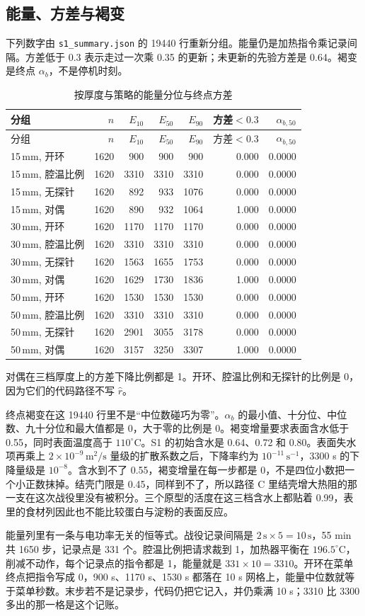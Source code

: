\subsection{能量、方差与褐变}
下列数字由 \texttt{s1\_summary.json} 的 19440 行重新分组。能量仍是加热指令乘记录间隔。方差低于 0.3 表示走过一次乘 0.35 的更新；未更新的先验方差是 0.64。褐变是终点 $\alpha_b$，不是停机时刻。
\begin{longtable}{lrrrrrr}
\caption{按厚度与策略的能量分位与终点方差}\\
\toprule
分组 & $n$ & $E_{10}$ & $E_{50}$ & $E_{90}$ & 方差$<0.3$ & $\alpha_{b,50}$ \\
\midrule\endfirsthead
\toprule 分组 & $n$ & $E_{10}$ & $E_{50}$ & $E_{90}$ & 方差$<0.3$ & $\alpha_{b,50}$ \\\midrule\endhead
15\,mm, 开环 & 1620 & 900 & 900 & 900 & 0.000 & 0.0000 \\
15\,mm, 腔温比例 & 1620 & 3310 & 3310 & 3310 & 0.000 & 0.0000 \\
15\,mm, 无探针 & 1620 & 892 & 933 & 1076 & 0.000 & 0.0000 \\
15\,mm, 对偶 & 1620 & 890 & 932 & 1064 & 1.000 & 0.0000 \\
30\,mm, 开环 & 1620 & 1170 & 1170 & 1170 & 0.000 & 0.0000 \\
30\,mm, 腔温比例 & 1620 & 3310 & 3310 & 3310 & 0.000 & 0.0000 \\
30\,mm, 无探针 & 1620 & 1563 & 1655 & 1753 & 0.000 & 0.0000 \\
30\,mm, 对偶 & 1620 & 1629 & 1730 & 1836 & 1.000 & 0.0000 \\
50\,mm, 开环 & 1620 & 1530 & 1530 & 1530 & 0.000 & 0.0000 \\
50\,mm, 腔温比例 & 1620 & 3310 & 3310 & 3310 & 0.000 & 0.0000 \\
50\,mm, 无探针 & 1620 & 2901 & 3055 & 3178 & 0.000 & 0.0000 \\
50\,mm, 对偶 & 1620 & 3157 & 3250 & 3307 & 1.000 & 0.0000 \\
\bottomrule\end{longtable}
对偶在三档厚度上的方差下降比例都是 1。开环、腔温比例和无探针的比例是 0，因为它们的代码路径不写 $\hat r$。

终点褐变在这 19440 行里不是“中位数碰巧为零”。$\alpha_b$ 的最小值、十分位、中位数、九十分位和最大值都是 0，大于零的比例是 0。褐变增量要求表面含水低于 0.55，同时表面温度高于 $110^\circ\mathrm{C}$。S1 的初始含水是 0.64、0.72 和 0.80。表面失水项再乘上 $2\times 10^{-9}\,\mathrm{m}^2/\mathrm{s}$ 量级的扩散系数之后，下降率约为 $10^{-11}\,\mathrm{s}^{-1}$，3300 s 的下降量级是 $10^{-8}$。含水到不了 0.55，褐变增量在每一步都是 0，不是四位小数把一个小正数抹掉。结壳门限是 0.45，同样到不了，所以路径 C 里结壳增大热阻的那一支在这次战役里没有被积分。三个原型的活度在这三档含水上都贴着 0.99，表里的食材列因此也不能比较蛋白与淀粉的表面反应。

能量列里有一条与电功率无关的恒等式。战役记录间隔是 $2\,\mathrm{s}\times 5=10\,\mathrm{s}$，55 min 共 1650 步，记录点是 331 个。腔温比例把请求裁到 1，加热器平衡在 $196.5^\circ\mathrm{C}$，削减不动作，每个记录点的指令都是 1，能量就是 $331\times 10=3310$。开环在菜单终点把指令写成 0，900 s、1170 s、1530 s 都落在 10 s 网格上，能量中位数就等于菜单秒数。末步若不是记录步，代码仍把它记入，并仍乘满 10 s；3310 比 3300 多出的那一格是这个记账。
